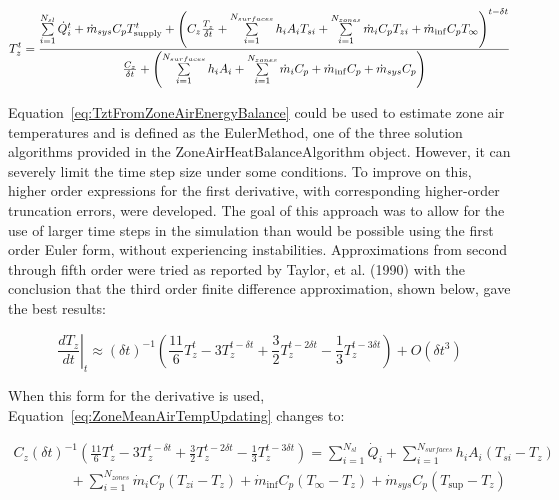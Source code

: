 \begin{equation}
T_z^t = \frac{{\sum\limits_{i = 1}^{{N_{sl}}} {\dot Q_i^t}  + {{\dot m}_{sys}}{C_p}T_{{\rm{supply}}}^t + {{\left( {{C_z}\frac{{T_z^{}}}{{\delta t}} + \sum\limits_{i = 1}^{{N_{surfaces}}} {{h_i}} {A_i}{T_{si}} + \sum\limits_{i = 1}^{{N_{zones}}} {{{\dot m}_i}} {C_p}{T_{zi}} + {{\dot m}_{\inf }}{C_p}{T_\infty }} \right)}^{t - \delta t}}}}{{\frac{{{C_z}}}{{\delta t}} + \left( {\sum\limits_{i = 1}^{{N_{surfaces}}} {{h_i}} {A_i} + \sum\limits_{i = 1}^{{N_{zones}}} {{{\dot m}_i}} {C_p} + {{\dot m}_{\inf }}{C_p} + {{\dot m}_{sys}}{C_p}} \right)}}
\label{eq:TztFromZoneAirEnergyBalance}
\end{equation}

Equation~\ref{eq:TztFromZoneAirEnergyBalance} could be used to estimate zone air temperatures and is defined as the EulerMethod, one of the three solution algorithms provided in the ZoneAirHeatBalanceAlgorithm object. However, it can severely limit the time step size under some conditions. To improve on this, higher order expressions for the first derivative, with corresponding higher-order truncation errors, were developed. The goal of this approach was to allow for the use of larger time steps in the simulation than would be possible using the first order Euler form, without experiencing instabilities. Approximations from second through fifth order were tried as reported by Taylor, et al. (1990) with the conclusion that the third order finite difference approximation, shown below, gave the best results:

\begin{equation}
{\left. {\frac{{d{T_z}}}{{dt}}} \right|_t} \approx {\left( {\delta t} \right)^{ - 1}}\left( {\frac{{11}}{6}T_z^t - 3T_z^{t - \delta t} + \frac{3}{2}T_z^{t - 2\delta t} - \frac{1}{3}T_z^{t - 3\delta t}} \right) + O\left( {\delta {t^3}} \right)
\end{equation}

When this form for the derivative is used, Equation~\ref{eq:ZoneMeanAirTempUpdating} changes to:

\begin{equation}
\begin{array}{l}
{C_z}{\left( {\delta t} \right)^{ - 1}}\left( {\frac{{11}}{6}T_z^t - 3T_z^{t - \delta t} + \frac{3}{2}T_z^{t - 2\delta t} - \frac{1}{3}T_z^{t - 3\delta t}} \right) = \sum\limits_{i = 1}^{{N_{sl}}} {{{\dot Q}_i}}  + \sum\limits_{i = 1}^{{N_{surfaces}}} {{h_i}} {A_i}\left( {{T_{si}} - {T_z}} \right) \\
\quad \quad \quad \quad + \sum\limits_{i = 1}^{{N_{zones}}} {{{\dot m}_i}} {C_p}\left( {{T_{zi}} - {T_z}} \right) + {{\dot m}_{\inf }}{C_p}\left( {{T_\infty } - {T_z}} \right) + {{\dot m}_{sys}}{C_p}\left( {{T_{\sup }} - {T_z}} \right)
\end{array}
\end{equation}

